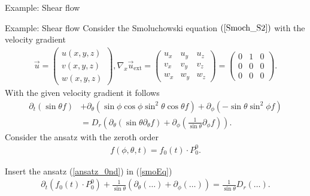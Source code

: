 \begin{frame}
	\centering
	Example: Shear flow
\end{frame}

\begin{frame}{Example: Shear flow}
	\scriptsize
	Consider the Smoluchowski equation $(\ref{Smoch_S2})$ with the velocity gradient 
	\begin{align*}
		\vec{u}=\left(\begin{array}{l}
			u(x,y,z) \\
			v(x,y,z) \\
			w(x,y,z)
		\end{array}\right),
		\nabla_x \vec{u}_{\mathrm{ext}}=\left(\begin{array}{lll}
			u_{x} & u_{y} & u_{z} \\
			v_{x} & v_{y} & v_{z} \\
			w_{x} & w_{y} & w_{z}
		\end{array}\right)=\left(\begin{array}{ccc}
			0 & 1 & 0 \\
			0 & 0 & 0 \\
			0 & 0 & 0
		\end{array}\right) .
	\end{align*}
	With the given velocity gradient it follows
	\begin{align}
		\partial_{t}\left(\sin \theta f\right) &+ \partial_\theta\left(\sin \phi \cos \phi \sin ^2 \theta \cos \theta f\right)+ \partial_\phi\left(- \sin \theta \sin ^2 \phi f \right) \nonumber \\
		&=D_{r}\left(\partial_\theta \left(\sin \theta \partial_\theta f\right)+ \partial_\phi\left(\frac{1}{\sin \theta} \partial_\phi f\right)\right). \label{smoEq} 
	\end{align}
	Consider the ansatz with the zeroth order
	\begin{align}
		f(\phi, \theta, t)= f_0(t) \cdot P_0^0 \label{ansatz_0nd}.
	\end{align}

	Insert the ansatz (\ref{ansatz_0nd}) in (\ref{smoEq})
	\begin{align}
		\partial_{t}(f_0(t) \cdot P_0^0)+\frac{1}{\sin \theta}\left(\partial_\theta(\ldots)+\partial_\phi(\ldots)\right)=\frac{1}{\sin \theta} D_r \left(\ldots \right) \label{eq_mitAnsatz}.
	\end{align}
\end{frame}

